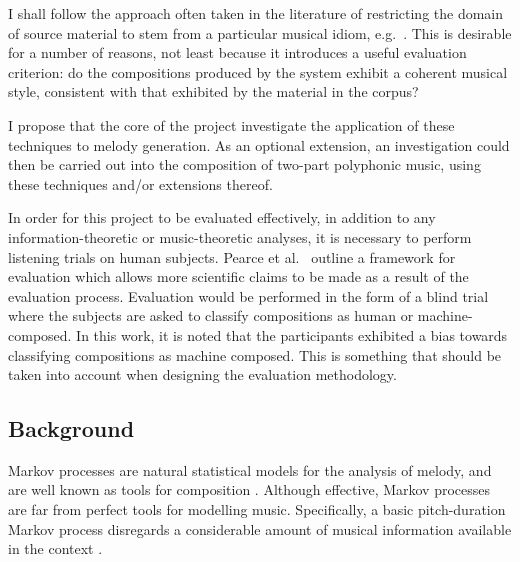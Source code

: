 \documentclass[12pt,a4paper,twoside]{article}
\begin{document}
I shall follow the approach often taken in the literature of restricting the
domain of source material to stem from a particular musical idiom, e.g.\
\cite{pearce2001evaluation}. This is desirable for a number of reasons, not
least because it introduces a useful evaluation criterion: do the compositions
produced by the system exhibit a coherent musical style, consistent with that
exhibited by the material in the corpus?

I propose that the core of the project investigate the application of these
techniques to melody generation. As an optional extension, an investigation
could then be carried out into the composition of two-part polyphonic music,
using these techniques and/or extensions thereof.

In order for this project to be evaluated effectively, in addition to any
information-theoretic or music-theoretic analyses, it is necessary to perform
listening trials on human subjects. Pearce et al.\ \cite{pearce2001evaluation}
outline a framework for evaluation which allows more scientific claims to be
made as a result of the evaluation process. Evaluation would be performed in the
form of a blind trial where the subjects are asked to classify compositions as
human or machine-composed. In this work, it is noted that the participants
exhibited a bias towards classifying compositions as machine composed. This is
something that should be taken into account when designing the evaluation
methodology.
\subsection*{Background}

% 

Markov processes are natural statistical models for the analysis of melody, and
are well known as tools for composition \cite{ames1989markov}. Although
effective, Markov processes are far from perfect tools for modelling music.
Specifically, a basic pitch-duration Markov process disregards a considerable
amount of musical information available in the context
\cite{conklin1995viewpoints}.  
\end{document}
